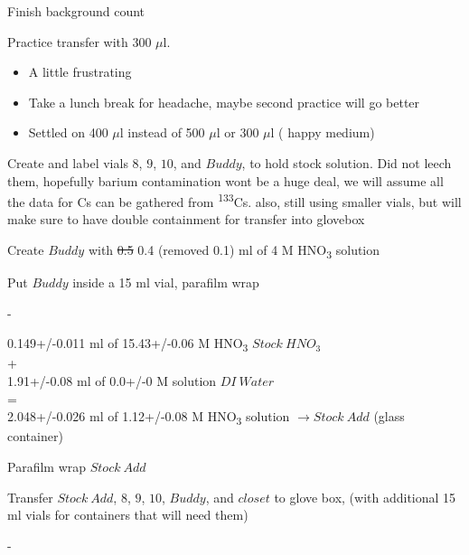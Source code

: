\documentclass[idxtotoc,hyperref,openany,oneside]{labbook} %
\newcommand{\cmark}{\ding{51}}%
\newcommand{\done}{\rlap{$\square$}{\raisebox{2pt}{\large\hspace{1pt}\cmark}}%
  \hspace{-2.5pt}}
\newcommand{\tss}{\textsuperscript}
\newcommand{\tsbs}{\textsubscript}
\begin{document}




\begin{todolist}
\item[\done]{Finish background count}
\item[\done]{Practice transfer with 300 $\mu$l.}
  \begin{itemize}
  \item{A little frustrating}
  \item{Take a lunch break for headache, maybe second
    practice will go better}
  \item{Settled on 400 $\mu$l instead of 500 $\mu$l or 300 $\mu$l (
    happy medium)}
  \end{itemize}
\item[\done]{Create and label vials $\boxed{8}$, $\boxed{9}$,
  $\boxed{10}$, and $\boxed{Buddy}$, to hold stock solution.
  Did not leech them,
  hopefully barium contamination wont be a huge deal,
  we will assume all the data for Cs can be gathered from \tss{133}Cs.
  also, still using smaller vials, but will make sure to have
  double containment for transfer into glovebox}
\item[\done]{Create $\boxed{Buddy}$ with \st{0.5} 0.4 (removed 0.1) ml of 4 M HNO\tsbs{3}
  solution}
\item[\done]{Put $\boxed{Buddy}$ inside a 15 ml vial, parafilm wrap}
\item[\done]{-}
\end{todolist}
\begin{center}
    0.149+/-0.011 ml of 15.43+/-0.06 M HNO\tsbs{3} $\boxed{Stock\ HNO_3}$\\
    +\\
    1.91+/-0.08  ml of 0.0+/-0 M solution $\boxed{DI\ Water}$\\
    = \\
    2.048+/-0.026 ml of 1.12+/-0.08 M HNO\tsbs{3}
  solution $\boxed{\rightarrow Stock\ Add}$ (glass container)
\end{center}
\begin{todolist}
\item[\done]{Parafilm wrap $\boxed{Stock\ Add}$}
\item[\done]{Transfer $\boxed{Stock\ Add}$, $\boxed{8}$, $\boxed{9}$,
  $\boxed{10}$, $\boxed{Buddy}$, and $\boxed{closet}$ to glove box, (with additional 15 ml vials for containers that will need them)}
\item[\done]{-}
\end{todolist}
\end{document}
